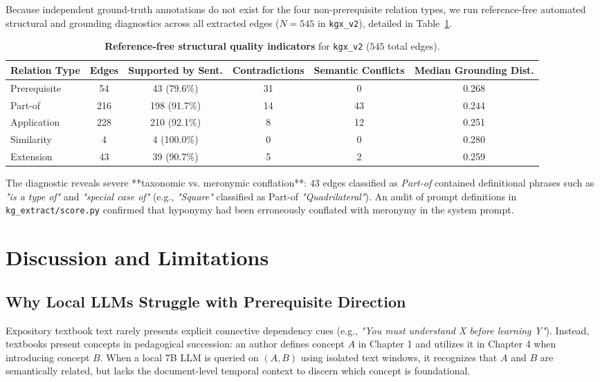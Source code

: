 \documentclass[11pt,a4paper]{article}
\begin{document}
Because independent ground-truth annotations do not exist for the four non-prerequisite relation types, we run reference-free automated structural and grounding diagnostics across all extracted edges ($N=545$ in \texttt{kgx\_v2}), detailed in Table~\ref{tab:relations}.

\begin{table}[h]
\centering
\small
\begin{tabular}{lccccc}
\toprule
\textbf{Relation Type} & \textbf{Edges} & \textbf{Supported by Sent.} & \textbf{Contradictions} & \textbf{Semantic Conflicts} & \textbf{Median Grounding Dist.} \\
\midrule
Prerequisite & 54 & 43 (79.6\%) & 31 & 0 & 0.268 \\
Part-of & 216 & 198 (91.7\%) & 14 & 43 & 0.244 \\
Application & 228 & 210 (92.1\%) & 8 & 12 & 0.251 \\
Similarity & 4 & 4 (100.0\%) & 0 & 0 & 0.280 \\
Extension & 43 & 39 (90.7\%) & 5 & 2 & 0.259 \\
\bottomrule
\end{tabular}
\caption{\textbf{Reference-free structural quality indicators} for \texttt{kgx\_v2} ($545$ total edges).}
\label{tab:relations}
\end{table}

The diagnostic reveals severe **taxonomic vs. meronymic conflation**: $43$ edges classified as \textit{Part-of} contained definitional phrases such as \textit{"is a type of"} and \textit{"special case of"} (e.g., \textit{"Square"} classified as Part-of \textit{"Quadrilateral"}). An audit of prompt definitions in \texttt{kg\_extract/score.py} confirmed that hyponymy had been erroneously conflated with meronymy in the system prompt.

\section{Discussion and Limitations}

\subsection{Why Local LLMs Struggle with Prerequisite Direction}
Expository textbook text rarely presents explicit connective dependency cues (e.g., \textit{"You must understand X before learning Y"}). Instead, textbooks present concepts in pedagogical succession: an author defines concept $A$ in Chapter 1 and utilizes it in Chapter 4 when introducing concept $B$. When a local 7B LLM is queried on $(A, B)$ using isolated text windows, it recognizes that $A$ and $B$ are semantically related, but lacks the document-level temporal context to discern which concept is foundational.
\end{document}
